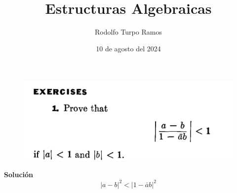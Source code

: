 \documentclass{article}
\title{Estructuras Algebraicas}
\author{Rodolfo Turpo Ramos}
\date{10 de agosto del 2024}
\begin{document}
\maketitle
\begin{figure}[h]
    \includegraphics[width=0.5\linewidth]{image.png}
\end{figure}
\textbf{\large Solución}
\[|a-b|^2<|1-\bar ab|^2\]
\end{document}
